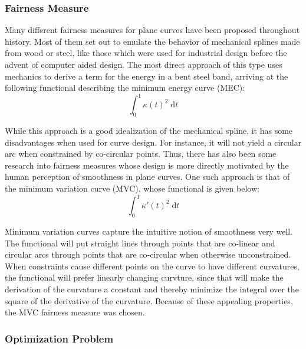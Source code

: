 \documentclass[a4paper]{article}
\newcommand{\apply}[2]{#1\!\left(#2\right)}
\begin{document}
			\subsubsection{Fairness Measure}
			\label{section:fairness_measure}


				Many different fairness measures for plane curves have been proposed throughout history. Most of them set out to emulate the behavior of mechanical splines made from wood or steel, like those which were used for industrial design before the advent of computer aided design. The most direct approach of this type uses mechanics to derive a term for the energy in a bent steel band, arriving at the following functional describing the minimum energy curve (MEC):
				\begin{displaymath}
					\int_{0}^{1}\apply{\kappa}{t}^2\;\mathrm{d}t
				\end{displaymath}

				While this approach is a good idealization of the mechanical spline, it has some disadvantages when used for curve design. For instance, it will not yield a circular arc when constrained by co-circular points. Thus, there has also been some research into fairness measures whose design is more directly motivated by the human perception of smoothness in plane curves. One such approach is that of the minimum variation curve (MVC), whose functional is given below:
				\begin{displaymath}
					\int_{0}^{1}\apply{\kappa'}{t}^2\;\mathrm{d}t
				\end{displaymath}

				Minimum variation curves capture the intuitive notion of smoothness very well. The functional will put straight lines through points that are co-linear and circular arcs through points that are co-circular when otherwise unconstrained. When constraints cause different points on the curve to have different curvatures, the functional will prefer linearly changing curvture, since that will make the derivation of the curvature a constant and thereby minimize the integral over the square of the derivative of the curvature. Because of these appealing properties, the MVC fairness measure was chosen.

			\subsubsection{Optimization Problem}
			\label{section:optimization_problem}
\end{document}
